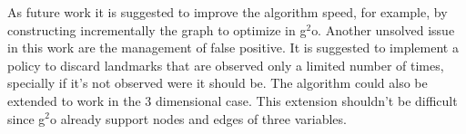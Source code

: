 \begin{conclusion}
As future work it is suggested to improve the algorithm speed, for example, by constructing incrementally the graph to optimize in g$^2$o. Another unsolved issue in this work are the management of false positive. It is suggested to implement a policy to discard landmarks that are observed only a limited number of times, specially if it's not observed were it should be. The algorithm could also be extended to work in the 3 dimensional case. This extension shouldn't be difficult since g$^2$o already support nodes and edges of three variables. 

\end{conclusion}